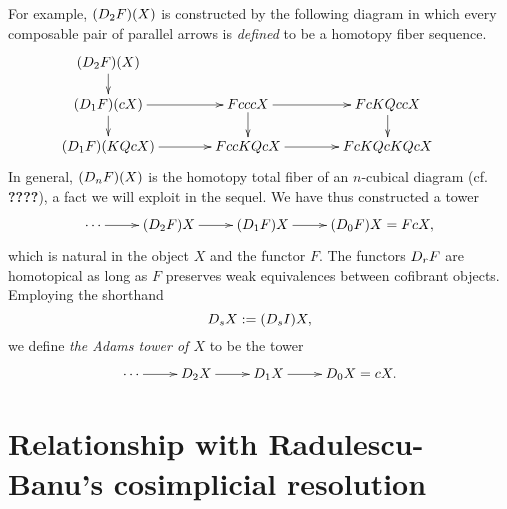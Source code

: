 \documentclass[11pt]{amsart}
\theoremstyle{plain}
\newcommand{\dupdown}[2]{D_{\smash{#1}}}
\begin{document}
For example, $(\dupdown{2}{c}F)(X)$ is constructed by the following diagram in which every composable pair of parallel arrows is \emph{defined} to be a homotopy fiber sequence.
\[\def\labelstyle{\scriptstyle}
\xymatrix@!0@R=30pt@C=50pt{
(\dupdown{2}{c}F)(X)\ar[d]\\
(\dupdown{1}{c}F)(cX) \ar[rr]\ar[d]         &           &FcccX \ar[rr]\ar[d]         &           &   FcKQccX            \ar[d]  &                  \\
(\dupdown{1}{c}F)(KQcX) \ar[rr] &                     &  FccKQcX \ar[rr] &             & FcKQcKQcX
}\]
In general, $(\dupdown{n}{c}F)(X)$ is the homotopy total fiber of an $n$-cubical diagram (cf. \textbf{????}), a fact we will exploit in the sequel. We have thus constructed a tower
\[\xymatrix@R=4mm{
\cdots 
\ar[r]
&%
(\dupdown{2}{c}F)X
\ar[r]
&%
(\dupdown{1}{c}F)X
\ar[r]&%
(\dupdown{0}{c}F)X=FcX,
}\]
which is natural in the object $X$ and the functor $F$.
The functors $\dupdown{r}{c}F$ are homotopical as long as $F$ preserves weak equivalences between cofibrant objects. Employing the shorthand
\[\dupdown{s}{c}X:=(\dupdown{s}{c}I)X,\]
we define \emph{the Adams tower of $X$} to be the tower
\[\xymatrix@R=4mm{
\cdots 
\ar[r]
&%
\dupdown{2}{c}X
\ar[r]
&%
\dupdown{1}{c}X
\ar[r]&%
\dupdown{0}{c}X=cX.
}\]

\section{Relationship with Radulescu-Banu's cosimplicial resolution}\label{sec:relnWithRB}
\end{document}
